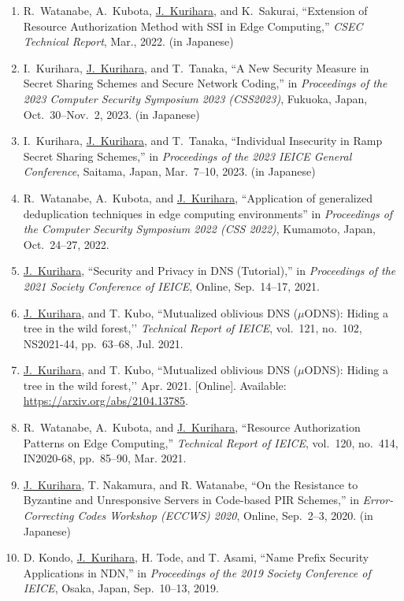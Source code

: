 \begin{enumerate}
 \item R.~Watanabe, A.~Kubota, \underline{J.~Kurihara}, and K.~Sakurai, ``Extension of Resource Authorization Method with SSI in Edge Computing,'' \textit{CSEC Technical Report}, Mar., 2022. (in Japanese)
 \item I.~Kurihara, \underline{J.~Kurihara}, and T.~Tanaka,
       ``A New Security Measure in Secret Sharing Schemes and Secure Network Coding,''
       in \textit{Proceedings of the 2023 Computer Security Symposium 2023 (CSS2023)},
       Fukuoka, Japan, Oct.~30--Nov.~2, 2023. (in Japanese)
 \item I.~Kurihara, \underline{J.~Kurihara}, and T.~Tanaka,
       ``Individual Insecurity in Ramp Secret Sharing Schemes,''
       in \textit{Proceedings of the 2023 IEICE General Conference},
       Saitama, Japan, Mar.~7--10, 2023. (in Japanese)
 \item R.~Watanabe, A.~Kubota, and \underline{J.~Kurihara}, ``Application of generalized deduplication techniques in edge computing environments'' in \textit{Proceedings of the Computer Security Symposium 2022 (CSS 2022)}, Kumamoto, Japan, Oct.~24--27, 2022.
 \item \underline{J.~Kurihara}, ``Security and Privacy in DNS (Tutorial),'' in \textit{Proceedings of the 2021 Society Conference of IEICE}, Online, Sep.~14--17, 2021.
 \item \underline{J.~Kurihara}, and T. Kubo, ``Mutualized oblivious DNS ($\mu$ODNS): Hiding a tree in the wild forest,’’ \textit{Technical Report of IEICE}, vol.~121, no.~102, NS2021-44, pp.~63--68, Jul. 2021.
 \item \underline{J.~Kurihara}, and T. Kubo, ``Mutualized oblivious DNS ($\mu$ODNS): Hiding a tree in the wild forest,’’ Apr. 2021. [Online]. Available: \url{https://arxiv.org/abs/2104.13785}.
\item R.~Watanabe, A.~Kubota, and \underline{J.~Kurihara}, ``Resource Authorization Patterns on Edge Computing,'' \textit{Technical Report of IEICE}, vol.~120, no.~414, IN2020-68, pp.~85--90, Mar. 2021.
 \item \underline{J.~Kurihara}, T. Nakamura, and R. Watanabe, ``On the Resistance to Byzantine and Unresponsive Servers in Code-based PIR Schemes,'' in \textit{Error-Correcting Codes Workshop (ECCWS) 2020}, Online, Sep.~2--3, 2020. (in Japanese)
 \item D. Kondo, \underline{J.~Kurihara}, H. Tode, and T. Asami, ``Name Prefix Security Applications in NDN,'' in \textit{Proceedings of the 2019 Society Conference of IEICE}, Osaka, Japan, Sep.~10--13, 2019.

\end{enumerate}
